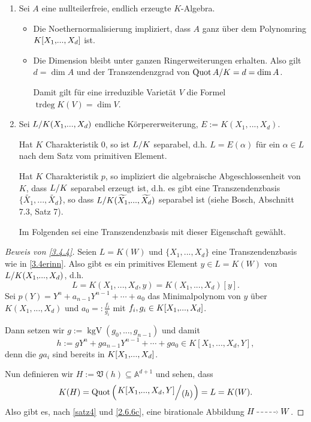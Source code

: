 \documentclass[a4paper,12pt,index=toc]{scrbook}
\theoremstyle{keinenummern} %
\def\A{\mathbb{A}}
\def\V{\mathfrak{V}}
\newcommand{\trdeg}{\operatorname{trdeg}}
\newcommand{\Quot}{\operatorname{Quot}}
\renewcommand{\dotsc}{\ensuremath{\!...}}
\newcommand{\schlange}[1]{\widetilde{#1}}
\newcommand{\polyx}[1][n]{\ensuremath%
  [X_{1},\dotsc,X_{#1}]}
\begin{document}
\begin{nerinnerung} 
\begin{enumerate}
  \item Sei $A$ eine nullteilerfreie, endlich erzeugte $K$-Algebra.
  \begin{itemize}
       \item Die Noethernormalisierung impliziert, dass $A$ ganz über dem Polynomring $K\polyx[d]$ ist.
       \item Die Dimension bleibt unter ganzen Ringerweiterungen erhalten. Also gilt $d=\dim A$ und der Transzendenzgrad von $\Quotient{\Quot A}{K}=d=\dim A$.
 
       Damit gilt für eine irreduzible Varietät $V$ die Formel $\trdeg K(V)=\dim V$.
  \end{itemize}
   \item{} Sei $\Quotient{L}{K(X_1,\dotsc,X_d)}$ endliche Körpererweiterung, $E:=K(X_1,\dotsc,X_d)$.

Hat $K$ Charakteristik $0$, so ist $\Quotient{L}{K}$ separabel, d.h. $L=E(\alpha)$ für ein $\alpha \in L$ nach dem Satz vom primitiven Element.

Hat $K$ Charakteristik $p$, so impliziert die algebraische Abgeschlossenheit von $K$, dass $\Quotient{L}{K}$ separabel erzeugt ist, d.h. es gibt eine Transzendenzbasis $\{\schlange{X_1},\dotsc,\schlange{X_d}\}$, so dass $\Quotient{L}{K(\schlange{X_1},\dotsc,\schlange{X_d})}$ separabel ist (siehe Bosch, Abschnitt 7.3, Satz 7).

Im Folgenden sei eine Transzendenzbasis mit dieser Eigenschaft gewählt.

\end{enumerate}
\end{nerinnerung}

\begin{proof}[Beweis von \cref{3.4.4}] Seien $L=K(W)$ und $\{X_1,\dotsc,X_d\}$ eine Transzendenzbasis wie in \ref{3.4erinn}. Also gibt es ein primitives Element $y\in L=K(W)$ von $\Quotient{L}{K(X_1,\dotsc,X_d)}$, d.h.
\begin{equation*}L=K(X_1,\dotsc,X_d,y)=K(X_1,\dotsc,X_d)[y].\end{equation*}
Sei $p(Y)=Y^n+a_{n-1}Y^{n-1}+\dotsm+a_0$ das Minimalpolynom von $y$ über $K(X_1,\dotsc,X_d)$ und $a_0=:\frac{f_i}{g_i}$ mit $f_i, g_i \in K\polyx[d]$.

Dann setzen wir $g:=\operatorname{kgV}(g_{0},\dotsc,g_{n-1})$ und damit
\begin{equation*}h:=gY^{n}+ga_{n-1}Y^{n-1}+\dotsm+ga_0 \in K[X_1,\dotsc,X_d,Y],\end{equation*} 
denn die $ga_{i}$ sind bereits in $K\polyx[d]$.

Nun definieren wir $H:=\V(h)\subseteq \A^{d+1}$ und sehen, dass
\begin{equation*}K(H)=\Quot\left(\Quotient{K[X_1,\dotsc,X_d,Y]}{(h)}\right)=L=K(W).\end{equation*}
Also gibt es, nach \cref{satz4} und \cref{2.6.6c}, eine birationale Abbildung $H\ppf W$.
\end{proof}
\end{document}
